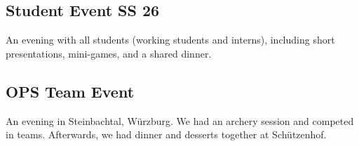 \subsection{Student Event SS 26}
An evening with all students (working students and interns), including short presentations, mini-games, and a shared dinner.

\subsection{OPS Team Event}
An evening in Steinbachtal, Würzburg. We had an archery session and competed in teams. Afterwards, we had dinner and desserts together at Schützenhof.

